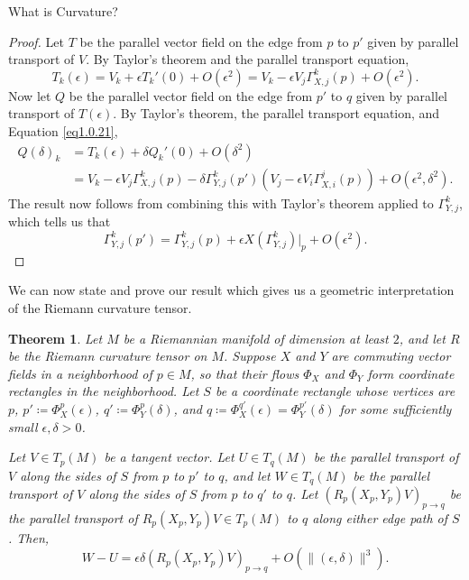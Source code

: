 \documentclass{article}
\numberwithin{equation}{subsection}
\newtheorem{theorem}{Theorem}[subsection]
\theoremstyle{definition}
\begin{document}
\begin{section}{What is Curvature?}
\begin{proof}
Let $T$ be the parallel vector field on the edge from $p$ to $p'$ given by parallel transport of $V$. By Taylor's theorem and the parallel transport equation,
\begin{equation}\label{eq1.0.21}
T_k(\epsilon)=V_k+\epsilon T_k'(0)+O(\epsilon^2)=V_k-\epsilon V_j\Gamma_{X,j}^k(p)+O(\epsilon^2).
\end{equation}
Now let $Q$ be the parallel vector field on the edge from $p'$ to $q$ given by parallel transport of $T(\epsilon)$. By Taylor's theorem, the parallel transport equation, and Equation \ref{eq1.0.21},
\begin{equation}
\begin{split}
Q(\delta)_k&=T_k(\epsilon)+\delta Q_k'(0)+O(\delta^2)\\
&=V_k-\epsilon V_j\Gamma_{X,j}^k(p)-\delta\Gamma_{Y,j}^{k}(p')\left(V_j-\epsilon V_i\Gamma_{X,i}^{j}(p)\right)+O(\epsilon^2,\delta^2).
\end{split}
\end{equation}
The result now follows from combining this with Taylor's theorem applied to $\Gamma_{Y,j}^k$, which tells us that
\begin{equation}
\Gamma_{Y,j}^k(p')=\Gamma_{Y,j}^k(p)+\epsilon X(\Gamma_{Y,j}^k)|_p+O(\epsilon^2).
\end{equation}
\end{proof}

We can now state and prove our result which gives us a geometric interpretation of the Riemann curvature tensor.

\begin{theorem}\label{curvaturearea}
Let $M$ be a Riemannian manifold of dimension at least $2$, and let $R$ be the Riemann curvature tensor on $M$. Suppose $X$ and $Y$ are commuting vector fields in a neighborhood of $p\in M$, so that their flows $\Phi_X$ and $\Phi_Y$ form coordinate rectangles in the neighborhood. Let $S$ be a coordinate rectangle whose vertices are $p$, $p'\coloneqq\Phi_{X}^{p}(\epsilon)$, $q'\coloneqq\Phi_{Y}^{p}(\delta)$, and $q\coloneqq\Phi_X^{q'}(\epsilon)=\Phi_Y^{p'}(\delta)$ for some sufficiently small $\epsilon,\delta>0$.

Let $V\in T_p(M)$ be a tangent vector. Let $U\in T_q(M)$ be the parallel transport of $V$ along the sides of $S$ from $p$ to $p'$ to $q$, and let $W\in T_q(M)$ be the parallel transport of $V$ along the sides of $S$ from $p$ to $q'$ to $q$. Let $(R_p(X_p,Y_p)V)_{p\to q}$ be the parallel transport of $R_p(X_p,Y_p)V\in T_p(M)$ to $q$ along either edge path of $S$. Then,
\begin{equation}\label{eq1.0.25}
W-U=\epsilon\delta(R_p(X_p,Y_p)V)_{p\to q}+O\left(\|(\epsilon,\delta)\|^3\right).
\end{equation}
\end{theorem}


\end{section}
\end{document}
